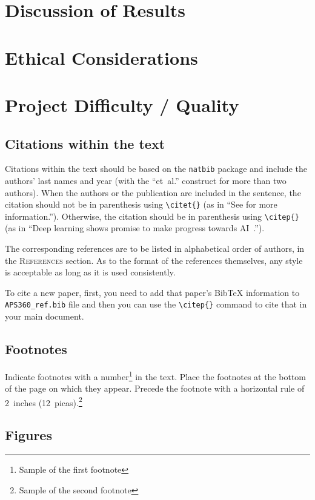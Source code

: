 \documentclass{article} %
\begin{document}
\section{Discussion of Results}

\section{Ethical Considerations}

\section{Project Difficulty / Quality}

\subsection{Citations within the text}

Citations within the text should be based on the \texttt{natbib} package
and include the authors' last names and year (with the ``et~al.'' construct
for more than two authors). When the authors or the publication are
included in the sentence, the citation should not be in parenthesis using \verb|\citet{}| (as
in ``See \citet{Hinton06} for more information.''). Otherwise, the citation
should be in parenthesis using \verb|\citep{}| (as in ``Deep learning shows promise to make progress
towards AI~\citep{Bengio+chapter2007}.'').

The corresponding references are to be listed in alphabetical order of
authors, in the \textsc{References} section. As to the format of the
references themselves, any style is acceptable as long as it is used
consistently.

To cite a new paper, first, you need to add that paper's BibTeX information to \verb+APS360_ref.bib+ file and then you can use the \verb|\citep{}| command to cite that in your main document. 

\subsection{Footnotes}

Indicate footnotes with a number\footnote{Sample of the first footnote} in the
text. Place the footnotes at the bottom of the page on which they appear.
Precede the footnote with a horizontal rule of 2~inches
(12~picas).\footnote{Sample of the second footnote}

\subsection{Figures}
\end{document}
